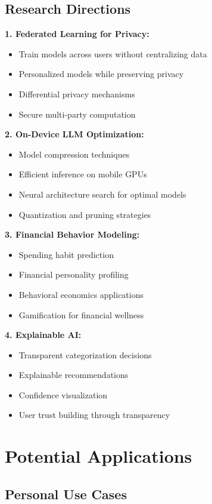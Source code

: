 \documentclass[11pt,a4paper]{report}
\begin{document}
\begin{itemize}
\subsection{Research Directions}

\textbf{1. Federated Learning for Privacy:}
\begin{itemize}
    \item Train models across users without centralizing data
    \item Personalized models while preserving privacy
    \item Differential privacy mechanisms
    \item Secure multi-party computation
\end{itemize}

\textbf{2. On-Device LLM Optimization:}
\begin{itemize}
    \item Model compression techniques
    \item Efficient inference on mobile GPUs
    \item Neural architecture search for optimal models
    \item Quantization and pruning strategies
\end{itemize}

\textbf{3. Financial Behavior Modeling:}
\begin{itemize}
    \item Spending habit prediction
    \item Financial personality profiling
    \item Behavioral economics applications
    \item Gamification for financial wellness
\end{itemize}

\textbf{4. Explainable AI:}
\begin{itemize}
    \item Transparent categorization decisions
    \item Explainable recommendations
    \item Confidence visualization
    \item User trust building through transparency
\end{itemize}

\section{Potential Applications}

\subsection{Personal Use Cases}


\end{itemize}
\end{document}
